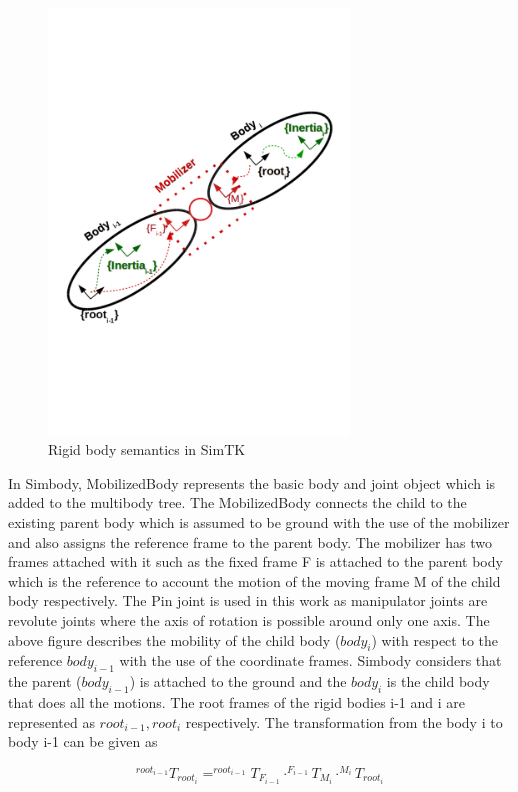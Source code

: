 \begin{figure}[h]
\centering
\includegraphics[width=80mm, trim=0 200 0 200]{pictures/simbody_rigidbody}
\caption{Rigid body semantics in SimTK}
\label{fig:simbody_rigidbody}
\end{figure}

In Simbody, MobilizedBody represents the basic body and joint object which is added to the multibody tree. The MobilizedBody connects the child to the existing parent body which is assumed to be ground with the use of the mobilizer and also assigns the reference frame to the parent body. The mobilizer has two frames attached with it such as the fixed frame F is attached to the parent body which is the reference to account the motion of the moving frame M of the child body respectively. The Pin joint is used in this work as manipulator joints are revolute joints where the axis of rotation is possible around only one axis. The above figure describes the mobility of the child body ($body_{i}$) with respect to the reference $body_{i-1}$ with the use of the coordinate frames. Simbody considers that the parent ($body_{i-1}$) is attached to the ground and the $body_i$ is the child body that does all the motions. The root frames of the rigid bodies i-1 and i are represented as $root_{i-1}, root_i$ respectively. The transformation from the body i to body i-1 can be given as

\begin{equation}
^{root_{i-1}}T_{root_i} = ^{root_{i-1}}T_{F_{i-1}}\cdot ^{F_{i-1}}T_{M_i}\cdot ^{M_i}T_{root_i}
\end{equation}

